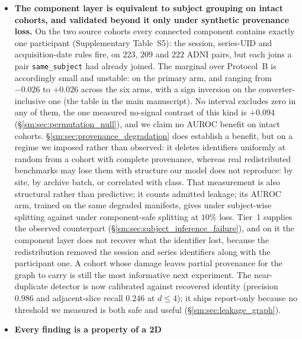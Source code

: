 \documentclass[11pt]{article}
\begin{document}
\begin{itemize}
          \item \textbf{The component layer is equivalent to subject
          grouping on intact cohorts, and validated beyond it only
          under synthetic provenance loss.} On the two source cohorts every
          connected component contains exactly one participant
          (Supplementary Table~S5): the session, series-UID
          and acquisition-date rules fire, on $223$, $209$ and $222$
          ADNI pairs, but each joins a pair \texttt{same\_subject} had
          already joined. The marginal over Protocol~B is accordingly small and unstable:
          \AdniMarginal{} \AdniMarginalCI{} on the primary arm, and
          ranging from $-0.026$ to $+0.026$ across the six arms, with a
          sign inversion on the converter-inclusive one
          (the table in the main manuscript). No interval excludes zero in any of
          them, the one measured no-signal contrast of this kind is
          $+0.094$ (\S\ref{sm:sec:permutation_null}), and we claim no
          AUROC benefit on intact cohorts.
          \S\ref{sm:sec:provenance_degradation} does establish a benefit,
          but on a regime we imposed rather than observed: it deletes
          identifiers uniformly at random from a cohort with complete
          provenance, whereas real redistributed benchmarks may lose
          them with structure our model does not reproduce: by site, by archive batch, or correlated with class. That
          measurement is also structural rather than predictive; it
          counts admitted leakage; its AUROC arm, trained on the same
          degraded manifests, gives \ProvSubjectAUROCTen{} under
          subject-wise splitting against \ProvSafeAUROCTen{} under
          component-safe splitting at $10\%$ loss. Tier~1 supplies the
          observed counterpart (\S\ref{sm:sec:subject_inference_failure}),
          and on it the component layer does not recover what the
          identifier lost, because the redistribution removed the
          session and series identifiers along with the participant
          one. A cohort whose damage leaves partial provenance for the
          graph to carry is still the most informative next experiment.
          The near-duplicate detector is now calibrated against
          recovered identity (precision $0.986$ and adjacent-slice
          recall $0.246$ at $d \leq 4$); it ships report-only because no
          threshold we measured is both safe and useful
          (\S\ref{sm:sec:leakage_graph}).
          \item \textbf{Every finding is a property of a 2D
}
\end{itemize}
\end{document}
